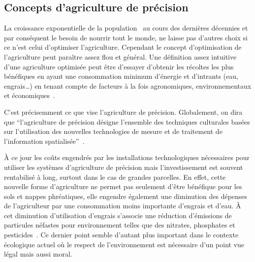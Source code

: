 \subsection{Concepts d'agriculture de précision}
La croissance exponentielle de la population~\cite{wiki:popu_mondiale}
au cours des dernières décennies et par conséquent le besoin de nourrir
tout le monde, ne laisse pas d'autres choix
si ce n'est celui d'optimiser l'agriculture.
Cependant le concept d'optimisation de l'agriculture peut 
paraître assez flou et général.
Une définition assez intuitive d'une agriculture optimisée
peut être d'essayer d'obtenir
les récoltes les plus bénéfiques en ayant une consommation minimum d'énergie
et d'intrants (eau, engrais\dots) en tenant compte de facteurs à la fois
agronomiques, environnementaux et économiques~\cite{wiki:agri_prec}.

C'est précisemment ce que vise l'agriculture de précision.
Globalement, on dira que \enquote{l'agriculture de précision désigne
l'ensemble des techniques culturales basées sur l'utilisation
des nouvelles technologies de mesure et de traitement de l'information
spatialisée}~\cite{jullien2005agriculture}.

À ce jour les coûts engendrés par les installations technologiques
nécessaires pour utiliser les systèmes d'agriculture de précision
mais l'investissement est souvent rentabilisé à long, surtout 
dans le cas de grandes parcelles.
En effet, cette nouvelle forme d'agriculture ne permet pas seulement
d'être bénéfique pour les sols et nappes phréatiques,
elle engendre également une diminution des dépenses de l'agriculteur
par une consommation moins importante d'engrais et d'eau.
À cet diminution d'utilisation d'engrais s'associe une réduction
d'émissions de particules néfastes pour
environnement telles que des nitrates, phosphates
et pesticides~\cite{emission_agri_particules}.
Ce dernier point semble d'autant plus important dans le contexte
écologique actuel où le respect de l'environnement est nécessaire
d'un point vue légal mais aussi moral.

